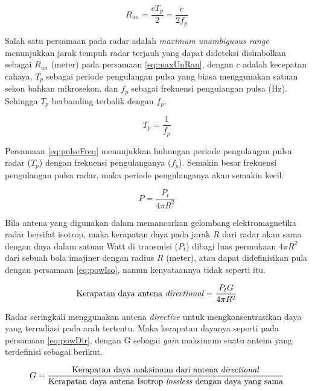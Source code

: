 \begin{equation}
	R_{un} = \frac{cT_{p}}{2} = \frac{c}{2f_{p}}
	\label{eq:maxUnRan}
\end{equation}

Salah satu persamaan pada radar adalah \textit{maximum unambiguous range} menunjukkan jarak tempuh radar terjauh yang dapat dideteksi disimbolkan sebagai $R_{un}$ (meter) pada persamaan \ref{eq:maxUnRan}, dengan $c$ adalah kecepatan cahaya, $T_{p}$ sebagai periode pengulangan pulsa yang biasa menggunakan satuan sekon bahkan mikrosekon, dan $f_{p}$ sebagai frekuensi pengulangan pulsa (Hz). Sehingga $T_{p}$ berbanding terbalik dengan $f_{p}$.

\begin{equation}
	T_{p} = \frac{1}{f_{p}}
	\label{eq:pulseFreq}
\end{equation}

Persamaan \ref{eq:pulseFreq} menunjukkan hubungan periode pengulangan pulsa radar ($T_{p}$) dengan frekuensi pengulanganya ($f_{p}$). Semakin besar frekuensi pengulangan pulsa radar, maka periode pengulanganya akan semakin kecil.

\begin{equation}
	P = \frac{P_{t}}{4\pi R^{2}}
	\label{eq:powIso}
\end{equation}

Bila antena yang digunakan dalam memancarkan gelombang elektromagnetika radar bersifat isotrop, maka kerapatan daya pada jarak $R$ dari radar akan sama dengan daya dalam satuan Watt di transmisi ($P_{t}$) dibagi luas permukaan $4\pi R^{2}$ dari sebuah bola imajiner dengan radius $R$ (meter), atau dapat didefinisikan pula dengan persamaan \ref{eq:powIso}, namun kenyataannya tidak seperti itu.

\begin{equation}
	\text{Kerapatan daya antena \textit{directional}} = \frac{P_{t} G}{4\pi R^{2}}
	\label{eq:powDir}
\end{equation}

Radar seringkali menggunakan antena \textit{directive} untuk mengkonsentrasikan daya yang terradiasi pada arah tertentu. Maka kerapatan dayanya seperti pada persamaan \ref{eq:powDir}, dengan G sebagai \textit{gain} maksimum suatu antena yang terdefinisi sebagai berikut.

\begin{equation}
	G  = \frac{\text{Kerapatan daya maksimum dari antena \textit{directional}}}{\text{Kerapatan daya antena Isotrop \textit{lossless} dengan daya yang sama}}
\end{equation}

